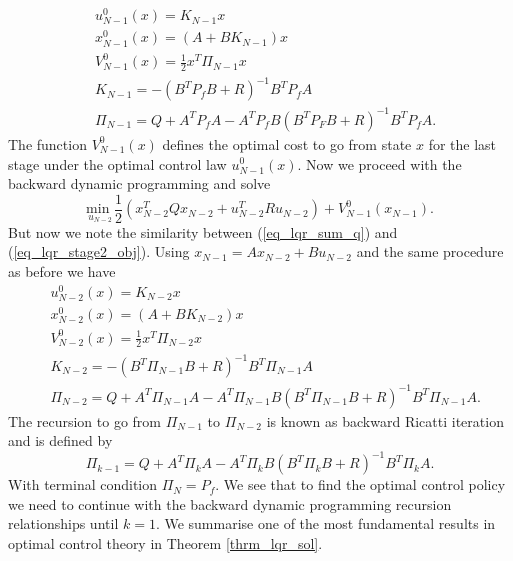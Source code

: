 \begin{equation}
\begin{aligned}
&u^0_{N-1}(x) = K_{N-1}x \\
&x^0_{N-1}(x) = (A+BK_{N-1})x \\
&V^0_{N-1}(x) = \frac{1}{2}x^T\Pi_{N-1}x \\
&K_{N-1} = -(B^TP_fB+R)^{-1}B^TP_fA \\
&\Pi_{N-1} = Q + A^TP_fA-A^TP_fB(B^TP_FB+R)^{-1}B^TP_fA. 
\end{aligned}
\label{eq_lqr_stage1}
\end{equation} 
The function $V^0_{N-1}(x)$ defines the optimal cost to go from state $x$ for the last stage under the optimal control law $u^0_{N-1}(x)$. Now we proceed with the backward dynamic programming and solve
\begin{equation}
\underset{u_{N-2}}{\text{min }}  \frac{1}{2}\left(x_{N-2}^TQx_{N-2} + u_{N-2}^TRu_{N-2} \right) + V^0_{N-1}(x_{N-1}).
\label{eq_lqr_stage2_obj}
\end{equation}
But now we note the similarity between (\ref{eq_lqr_sum_q}) and (\ref{eq_lqr_stage2_obj}). Using $x_{N-1}=Ax_{N-2}+Bu_{N-2}$ and the same procedure as before we have 
\begin{equation}
\begin{aligned}
&u^0_{N-2}(x) = K_{N-2}x \\
&x^0_{N-2}(x) = (A+BK_{N-2})x \\
&V^0_{N-2}(x) = \frac{1}{2}x^T\Pi_{N-2}x \\
&K_{N-2} = -(B^T\Pi_{N-1}B+R)^{-1}B^T\Pi_{N-1}A \\
&\Pi_{N-2} = Q + A^T\Pi_{N-1}A-A^T\Pi_{N-1}B(B^T\Pi_{N-1}B+R)^{-1}B^T\Pi_{N-1}A.
\end{aligned}
\label{eq_lqr_stage2}
\end{equation} 
The recursion to go from $\Pi_{N-1}$ to $\Pi_{N-2}$ is known as backward Ricatti iteration and is defined by
\begin{equation}
\Pi_{k-1} = Q + A^T\Pi_{k}A-A^T\Pi_{k}B(B^T\Pi_{k}B+R)^{-1}B^T\Pi_{k}A.  
\label{eq_ricatti}
\end{equation}
With terminal condition $\Pi_N = P_f$. We see that to find the optimal control policy we need to continue with the backward dynamic programming recursion relationships until $k = 1$. We summarise one of the most fundamental results in optimal control theory in Theorem \ref{thrm_lqr_sol}.
